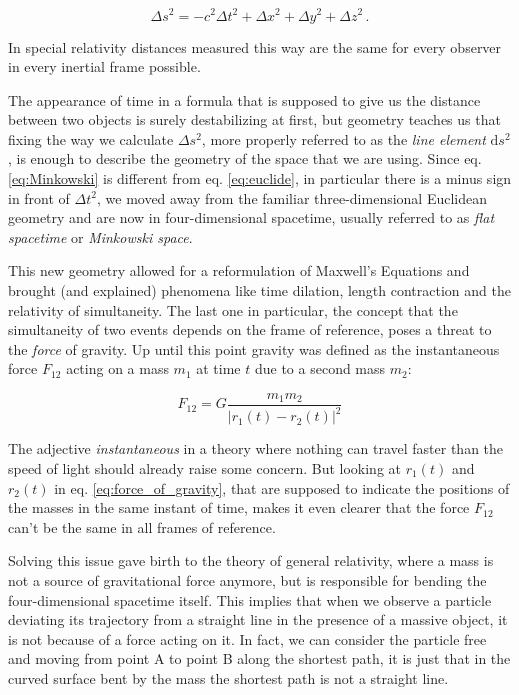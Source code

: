 \begin{equation}
    \Delta s^2 = - c^2 \Delta t^2 + \Delta x^2 + \Delta y^2 + \Delta z^2 \, .
    \label{eq:Minkowski}
\end{equation}

In special relativity distances measured this way are the same for every
observer in every inertial frame possible.

The appearance of time in a formula that is supposed to give us the distance
between two objects is surely destabilizing at first, but geometry teaches us
that fixing the way we calculate $\Delta s^2$, more properly referred to as the
\textit{line element} $\mathrm{d}s^2$, is enough to describe the geometry of
the space that we are using.
Since eq. \ref{eq:Minkowski} is different from eq. \ref{eq:euclide}, in
particular there is a minus sign in front of $\Delta t^2$, we moved away from
the familiar three-dimensional Euclidean geometry and are now in
four-dimensional spacetime, usually referred to as \textit{flat spacetime} or
\textit{Minkowski space}.

This new geometry allowed for a reformulation of Maxwell's Equations and
brought (and explained) phenomena like time dilation, length contraction and the
relativity of simultaneity.
The last one in particular, the concept that the simultaneity of two events
depends on the frame of reference, poses a threat to the \textit{force} of
gravity.
Up until this point gravity was defined as the instantaneous force $F_{12}$
acting on a mass $m_1$ at time $t$ due to a second mass $m_2$:

\begin{equation}
    F_{12} = G \frac{m_1 m_2}{|r_1(t) - r_2(t)|^2}
    \label{eq:force_of_gravity}
\end{equation}

The adjective \textit{instantaneous} in a theory where nothing can travel
faster than the speed of light should already raise some concern.
But looking at $r_1(t)$ and $r_2(t)$ in eq. \ref{eq:force_of_gravity}, that are
supposed to indicate the positions of the masses in the same instant of time,
makes it even clearer that the force $F_{12}$ can't be the same in all
frames of reference.

Solving this issue gave birth to the theory of general relativity, where a mass
is not a source of gravitational force anymore, but is responsible for
bending the four-dimensional spacetime itself.
This implies that when we observe a particle deviating its trajectory from a
straight line in the presence of a massive object, it is not because of a force
acting on it.
In fact, we can consider the particle free and moving from point A to point B
along the shortest path, it is just that in the curved surface bent by the mass
the shortest path is not a straight line.

